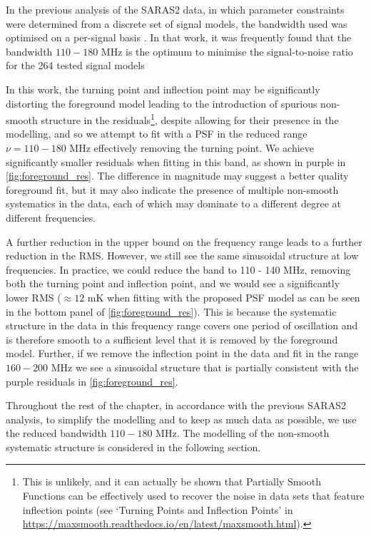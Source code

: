 In the previous analysis of the SARAS2 data, in which parameter constraints were determined from a discrete set of signal models, the bandwidth used was optimised on a per-signal basis \citep{Singh_saras2_2017, Singh_saras2_2018}. In that work, it was frequently found that the bandwidth $110-180$ MHz is the optimum to minimise the signal-to-noise ratio for the 264 tested signal models

In this work, the turning point and inflection point may be significantly distorting the foreground model leading to the introduction of spurious non-smooth structure in the residuals\footnote{This is unlikely, and it can actually be shown that Partially Smooth Functions can be effectively used to recover the noise in data sets that feature inflection points (see `Turning Points and Inflection Points' in \url{https://maxsmooth.readthedocs.io/en/latest/maxsmooth.html}).}, despite allowing for their presence in the modelling, and so we attempt to fit with a PSF in the reduced range $\nu = 110 - 180$ MHz effectively removing the turning point. We achieve significantly smaller residuals when fitting in this band, as shown in purple in \cref{fig:foreground_res}. The difference in magnitude may suggest a better quality foreground fit, but it may also indicate the presence of multiple non-smooth systematics in the data, each of which may dominate to a different degree at different frequencies. 

A further reduction in the upper bound on the frequency range leads to a further reduction in the RMS. However, we still see the same sinusoidal structure at low frequencies. In practice, we could reduce the band to 110 - 140 MHz, removing both the turning point and inflection point, and we would see a significantly lower RMS ($\approx 12$ mK when fitting with the proposed PSF model as can be seen in the bottom panel of \cref{fig:foreground_res}). This is because the systematic structure in the data in this frequency range covers one period of oscillation and is therefore smooth to a sufficient level that it is removed by the foreground model. Further, if we remove the inflection point in the data and fit in the range $160 - 200$ MHz we see a sinusoidal structure that is partially consistent with the purple residuals in \cref{fig:foreground_res}.

Throughout the rest of the chapter, in accordance with the previous SARAS2 analysis, to simplify the modelling and to keep as much data as possible, we use the reduced bandwidth $110 - 180$ MHz. The modelling of the non-smooth systematic structure is considered in the following section.

